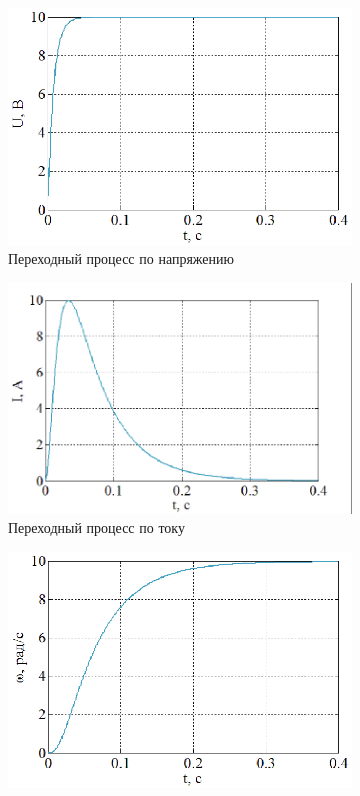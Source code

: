 \documentclass[a4paper,12pt]{article} %
\begin{document}
\begin{figure}[H]
	\centering
	\begin{subfigure}[b]{0.48\textwidth}
	    \includegraphics[width = \textwidth]{scheme/U0}
		\caption{Переходный процесс по напряжению}
	\end{subfigure}
	\hfill
	\begin{subfigure}[b]{0.48\textwidth}
		\includegraphics[width = \textwidth]{scheme/I0}
		\caption{Переходный процесс по току}
	\end{subfigure}
	\begin{subfigure}[b]{0.48\textwidth}
		\includegraphics[width = \textwidth]{scheme/W0}

\end{subfigure}
\end{figure}
\end{document}
